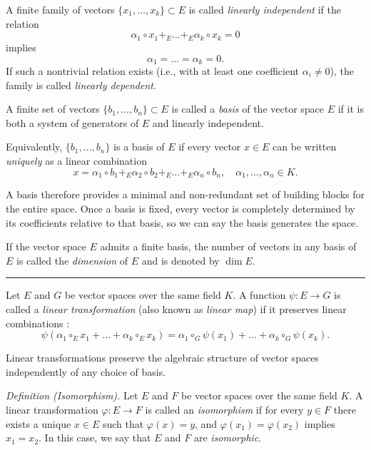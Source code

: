 \medskip

A finite family of vectors $\{x_1,\dots,x_k\} \subset E$ is called \emph{linearly independent} if the relation
\[
\alpha_1 \circ x_1 +_E \dots +_E \alpha_k \circ x_k = 0
\]
implies
\[
\alpha_1 = \dots = \alpha_k = 0.
\]
If such a nontrivial relation exists (i.e., with at least one coefficient $\alpha_i\neq 0$), the family is called \emph{linearly dependent}.

\medskip

A finite set of vectors $\{b_1,\dots,b_n\} \subset E$ is called a \emph{basis} of the vector space $E$ if it is both a system of generators of $E$ and linearly independent.

\medskip

Equivalently, $\{b_1,\dots,b_n\}$ is a basis of $E$ if every vector $x \in E$ can be written \emph{uniquely} as a linear combination
\[
x = \alpha_1 \circ b_1 +_E \alpha_2 \circ b_2 +_E \dots +_E \alpha_n \circ b_n,
\quad \alpha_1,\dots,\alpha_n \in K.
\]

A basis therefore provides a minimal and non-redundant set of building blocks for the entire space. Once a basis is fixed, every vector is completely determined by its coefficients relative to that basis, so we can say the basis generates the space.

\medskip

If the vector space $E$ admits a finite basis, the number of vectors in any basis of $E$ is called the \emph{dimension} of $E$ and is denoted by $\dim E$.

\bigskip
\hrule
\medskip


Let $E$ and $G$ be vector spaces over the same field $K$. A function
\(
\psi : E \to G
\)
is called a \emph{linear transformation} (also known as \textit{linear map}) if it preserves linear combinations \cite{iribarren}:
\[
\psi(\alpha_1 \circ_E x_1 + \dots + \alpha_k \circ_E x_k)
=
\alpha_1 \circ_G \psi(x_1) + \dots + \alpha_k \circ_G \psi(x_k).
\]

Linear transformations preserve the algebraic structure of vector spaces independently of any choice of basis.

\medskip

\textit{Definition (Isomorphism).}
Let $E$ and $F$ be vector spaces over the same field $K$.
A linear transformation $\varphi : E \to F$ is called an \emph{isomorphism}
if for every $y \in F$ there exists a unique $x \in E$ such that $\varphi(x) = y$,
and $\varphi(x_1) = \varphi(x_2)$ implies $x_1 = x_2$.
In this case, we say that $E$ and $F$ are \emph{isomorphic}.

